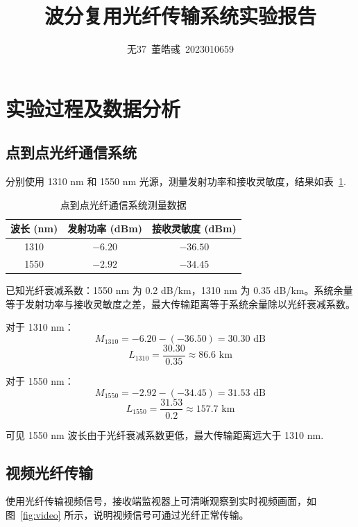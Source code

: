 \documentclass[utf8,twocolumn]{ctexart}
\title{波分复用光纤传输系统实验报告}
\author{无37~董皓彧~2023010659}
\date{\zhtoday}
\begin{document}
\maketitle
\thispagestyle{fancy}

\section{实验过程及数据分析}

\subsection{点到点光纤通信系统}
分别使用 1310 nm 和 1550 nm 光源，测量发射功率和接收灵敏度，结果如表~\ref{tab:p2p}.

\begin{table}[H]
    \centering
    \caption{点到点光纤通信系统测量数据}
    \label{tab:p2p}
    \begin{tabular}{ccc}
        \toprule
        波长 (nm) & 发射功率 (dBm) & 接收灵敏度 (dBm) \\
        \midrule
        1310 & $-6.20$ & $-36.50$ \\
        1550 & $-2.92$ & $-34.45$ \\
        \bottomrule
    \end{tabular}
\end{table}

已知光纤衰减系数：1550 nm 为 0.2 dB/km，1310 nm 为 0.35 dB/km。系统余量等于发射功率与接收灵敏度之差，最大传输距离等于系统余量除以光纤衰减系数。

对于 1310 nm：
\begin{equation}
    M_{1310} = -6.20 - (-36.50) = 30.30 \text{ dB}
\end{equation}
\begin{equation}
    L_{1310} = \frac{30.30}{0.35} \approx 86.6 \text{ km}
\end{equation}

对于 1550 nm：
\begin{equation}
    M_{1550} = -2.92 - (-34.45) = 31.53 \text{ dB}
\end{equation}
\begin{equation}
    L_{1550} = \frac{31.53}{0.2} \approx 157.7 \text{ km}
\end{equation}

可见 1550 nm 波长由于光纤衰减系数更低，最大传输距离远大于 1310 nm.

\subsection{视频光纤传输}
使用光纤传输视频信号，接收端监视器上可清晰观察到实时视频画面，如图~\ref{fig:video} 所示，说明视频信号可通过光纤正常传输。
\end{document}
